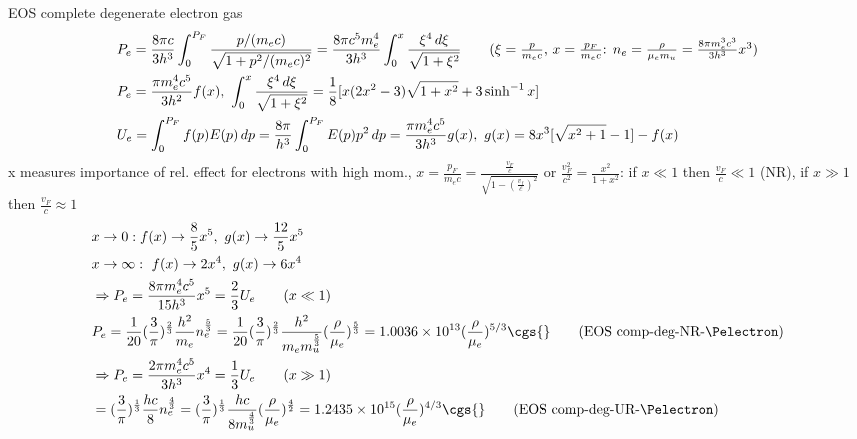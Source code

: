 \begin{frame}{EOS complete degenerate electron gas}
\begin{align*}
    &P_e=\frac{8\pi c}{3h^3}\int_0^{P_F}\frac{p/(m_ec)}{\sqrt{1+p^2/(m_ec)^2}}=\frac{8\pi c^5 m_e^4}{3h^3}\int_0^x \frac{\xi^4\,d\xi}{\sqrt{1+\xi^2}}\tag{$\xi=\frac{p}{m_ec}$, $x=\frac{p_F}{m_ec}$: $n_e=\frac{\rho}{\mu_em_u}=\frac{8\pi m_e^3c^3}{3h^3}x^3$}\\
    &P_e=\frac{\pi m_e^4c^5}{3h^2}f(x),\ \int_0^x \frac{\xi^4\,d\xi}{\sqrt{1+\xi^2}}=\frac{1}{8}[x(2x^2-3)\sqrt{1+x^2}+3\sinh^{-1}{x}]\\
    &U_e=\int_0^{P_F}f(p)E(p)\,dp=\frac{8\pi}{h^3}\int_0^{P_F}E(p)p^2\,dp=\frac{\pi m_e^4c^5}{3h^3}g(x),\ g(x)=8x^3[\sqrt{x^2+1}-1]-f(x)\\
\end{align*}
x measures importance of rel. effect for electrons with high mom., $x=\frac{p_F}{m_ec}=\frac{\frac{v_F}{c}}{\sqrt{1-(\frac{v_f}{c})^2}}$ or $\frac{v_F^2}{c^2}=\frac{x^2}{1+x^2}$: if $x\ll1$ then $\frac{v_F}{c}\ll1$ (NR), if $x\gg1$ then $\frac{v_F}{c}\approx1$
\begin{align*}
    &x\to0: f(x)\to \frac{8}{5}x^5,\ g(x)\to \frac{12}{5}x^5\\
    &x\to\infty:\ f(x)\to 2x^4,\ g(x)\to6x^4\\
    &\Rightarrow P_e=\frac{8\pi m_e^4c^5}{15h^3}x^5=\frac{2}{3}U_e\tag{$x\ll1$}\\
    &P_e=\frac{1}{20}(\frac{3}{\pi})^{\frac{2}{3}}\frac{h^2}{m_e}n_e^{\frac{5}{3}}=\frac{1}{20}(\frac{3}{\pi})^{\frac{2}{3}}\frac{h^2}{m_em_u^{\frac{5}{3}}}(\frac{\rho}{\mu_e})^{\frac{5}{3}}=\num{1.0036e13}(\frac{\rho}{\mu_e})\expy{5/3}\cgs{}\tag{EOS comp-deg-NR-\Pelectron}\\
    &\Rightarrow P_e=\frac{2\pi m_e^4c^5}{3h^3}x^4=\frac{1}{3}U_e\tag{$x\gg1$}\\
    &=(\frac{3}{\pi})^{\frac{1}{3}}\frac{hc}{8}n_e^{\frac{4}{3}}=(\frac{3}{\pi})^{\frac{1}{3}}\frac{hc}{8m_u^{\frac{4}{3}}}(\frac{\rho}{\mu_e})^{\frac{4}{2}}=\num{1.2435e15}(\frac{\rho}{\mu_e})\expy{4/3}\cgs{}\tag{EOS comp-deg-UR-\Pelectron}
\end{align*}
\end{frame}

